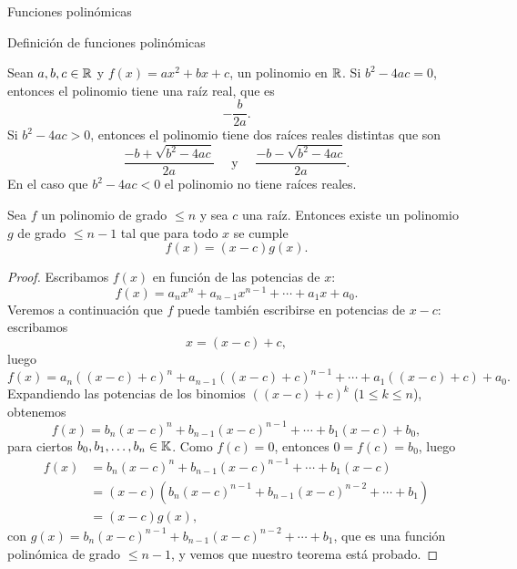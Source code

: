 \begin{chapter}{Funciones polinómicas}
\begin{section}{Definición de funciones polinómicas}
  \begin{ejemplo*}
      Sean $a,b,c \in \mathbb R$ y  $f(x) = ax^2 + bx + c$, un polinomio en $\mathbb R$.  Si $b^2 - 4 ac = 0$, entonces el polinomio tiene una raíz real, que es
      \begin{equation*}
          -\frac{b}{2a}.
      \end{equation*}
      Si $b^2 - 4 ac > 0$, entonces el polinomio tiene dos raíces reales distintas que son
      \begin{equation*}
          \frac{-b + \sqrt{b^2 - 4 ac}}{2a}\quad \text{ y }\quad \frac{-b - \sqrt{b^2 - 4 ac}}{2a}.
      \end{equation*}
      En el caso que $b^2 - 4 ac < 0$ el polinomio no tiene raíces reales.
  \end{ejemplo*}

  \begin{teorema}\label{th-fact-raiz}
      Sea $f$ un polinomio de grado $\le n$ y sea $c$ una raíz. Entonces existe un polinomio $g$ de grado $\le n - 1$ tal que para todo $x$ se cumple
      \begin{equation*}
          f (x) = (x - c) g (x).
      \end{equation*}
  \end{teorema}
  \begin{proof} Escribamos $f(x)$ en función de las potencias de  $x$:
      \begin{equation*}
          f(x) = a_nx^n + a_{n-1}x^{n-1}+\cdots + a_1x +a_0.
      \end{equation*}
      Veremos a continuación que $f$ puede también escribirse en potencias de $x-c$: escribamos
      \begin{equation*}
          x = (x-c)+ c,
      \end{equation*}
      luego
      \begin{equation*}
          f(x) = a_n((x-c)+ c)^n + a_{n-1}((x-c)+ c)^{n-1}+\cdots + a_1((x-c)+ c) +a_0.
      \end{equation*}
      Expandiendo las potencias de los binomios $((x-c)+ c)^k$ ($1 \le k \le n$),  obtenemos
      \begin{equation*}
          f(x) = b_n(x-c)^n + b_{n-1}(x-c)^{n-1}+\cdots + b_1(x-c) +b_0,
      \end{equation*}
      para ciertos $b_0, b_1,\ldots ,b_n \in \mathbb K$. Como $f(c) = 0$,  entonces $0=f(c)=b_0$,  luego
      \begin{align*}
          f(x) & = b_n(x-c)^n + b_{n-1}(x-c)^{n-1}+\cdots + b_1(x-c)       \\
               & = (x-c)(b_n(x-c)^{n-1} + b_{n-1}(x-c)^{n-2}+\cdots + b_1) \\
               & =(x-c)g(x),
      \end{align*}
      con $g(x) =b_n(x-c)^{n-1} + b_{n-1}(x-c)^{n-2}+\cdots + b_1$,  que es una función polinómica de grado $\le n-1$, y vemos que nuestro teorema está probado.
  \end{proof}


\end{section}
\end{chapter}
